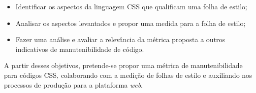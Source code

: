 \begin{itemize}
	\item Identificar os aspectos da linguagem CSS que qualificam uma folha de estilo;
	\item Analisar os aspectos levantados e propor uma medida para a folha de estilo;
	\item Fazer uma análise e avaliar a relevância da métrica proposta a outros indicativos de manutenibilidade de código.
\end{itemize}

A partir desses objetivos, pretende-se propor uma métrica de manutenibilidade para códigos CSS, colaborando com a medição de folhas de estilo e auxiliando nos processos de produção para a plataforma \textit{web}.


